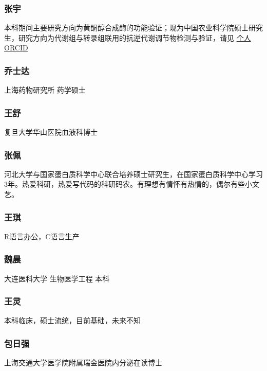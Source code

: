 \documentclass[]{article}
\begin{document}
\subsubsection{张宇}

本科期间主要研究方向为黄酮醇合成酶的功能验证；现为中国农业科学院硕士研究生，研究方向为代谢组与转录组联用的抗逆代谢调节物检测与验证，请见
\href{https://orcid.org/0000-0001-8506-5222}{个人ORCID}

\subsubsection{乔士达}

上海药物研究所 药学硕士

\subsubsection{王舒}

复旦大学华山医院血液科博士

\subsubsection{张佩}

河北大学与国家蛋白质科学中心联合培养硕士研究生，在国家蛋白质科学中心学习3年。热爱科研，热爱写代码的科研码农。有理想有情怀有热情的，偶尔有些小文艺。

\subsubsection{王琪}

R语言办公，C语言生产

\subsubsection{魏晨}

大连医科大学 生物医学工程 本科

\subsubsection{王灵}

本科临床，硕士流统，目前基础，未来不知

\subsubsection{包日强}

上海交通大学医学院附属瑞金医院内分泌在读博士
\end{document}
